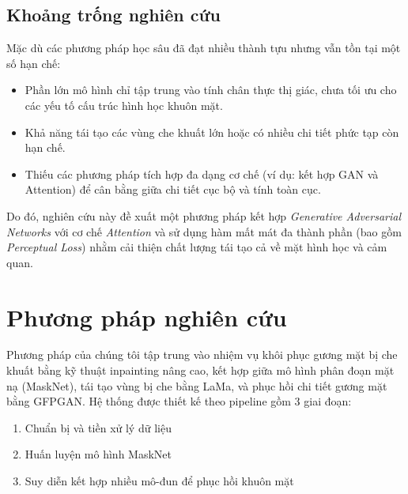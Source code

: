 \documentclass[12pt,a4paper]{article}
\begin{document}
	
	\subsection{Khoảng trống nghiên cứu}
	Mặc dù các phương pháp học sâu đã đạt nhiều thành tựu nhưng vẫn tồn tại một số hạn chế:
	\begin{itemize}
		\item Phần lớn mô hình chỉ tập trung vào tính chân thực thị giác, chưa tối ưu cho các yếu tố cấu trúc hình học khuôn mặt.
		\item Khả năng tái tạo các vùng che khuất lớn hoặc có nhiều chi tiết phức tạp còn hạn chế.
		\item Thiếu các phương pháp tích hợp đa dạng cơ chế (ví dụ: kết hợp GAN và Attention) để cân bằng giữa chi tiết cục bộ và tính toàn cục.
	\end{itemize}
	
	Do đó, nghiên cứu này đề xuất một phương pháp kết hợp \textit{Generative Adversarial Networks} với cơ chế \textit{Attention} và sử dụng hàm mất mát đa thành phần (bao gồm \textit{Perceptual Loss}) nhằm cải thiện chất lượng tái tạo cả về mặt hình học và cảm quan.
	
	
	\section{Phương pháp nghiên cứu}
	
	Phương pháp của chúng tôi tập trung vào nhiệm vụ khôi phục gương mặt bị che khuất bằng kỹ thuật inpainting nâng cao, kết hợp giữa mô hình phân đoạn mặt nạ (MaskNet), tái tạo vùng bị che bằng LaMa, và phục hồi chi tiết gương mặt bằng GFPGAN. Hệ thống được thiết kế theo pipeline gồm 3 giai đoạn:
	\begin{enumerate}
		\item Chuẩn bị và tiền xử lý dữ liệu
		\item Huấn luyện mô hình MaskNet
		\item Suy diễn kết hợp nhiều mô-đun để phục hồi khuôn mặt
	\end{enumerate}
	
\end{document}
